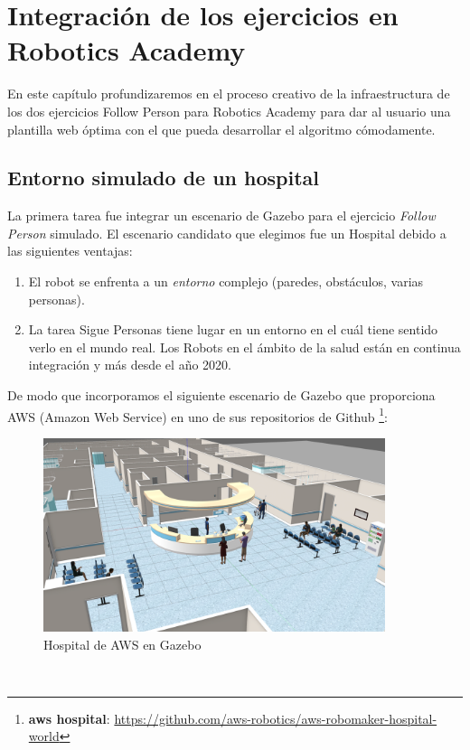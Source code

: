 \chapter{Integración de los ejercicios en Robotics Academy}
\label{cap:capitulo5}

En este capítulo profundizaremos en el proceso creativo de la infraestructura de los dos ejercicios Follow Person para Robotics Academy para dar al usuario una plantilla web óptima con el que pueda desarrollar el algoritmo cómodamente.\\


\section{Entorno simulado de un hospital}
\label{sec:hospital_gazebo}

La primera tarea fue integrar un escenario de Gazebo para el ejercicio \textit{Follow Person} simulado. El escenario candidato que elegimos fue un Hospital debido a las siguientes ventajas:

\begin{enumerate}
	\item El robot se enfrenta a un \textit{entorno} complejo (paredes, obstáculos, varias personas).
	\item La tarea Sigue Personas tiene lugar en un entorno en el cuál tiene sentido verlo en el mundo real. Los Robots en el ámbito de la salud están en continua integración y más desde el año 2020.
\end{enumerate}

De modo que incorporamos el siguiente escenario de Gazebo que proporciona AWS (Amazon Web Service) en uno de sus repositorios de Github \footnote{\textbf{aws hospital}: \url{https://github.com/aws-robotics/aws-robomaker-hospital-world}}:\\

\begin{figure} [H]
  \begin{center}
    \includegraphics[width=10cm]{imagenes/hospital_world.png}
  \end{center}
  \caption[Hospital de AWS en Gazebo]{Hospital de AWS en Gazebo}
  \label{fig:hospital_gazebo}
\end{figure}\

